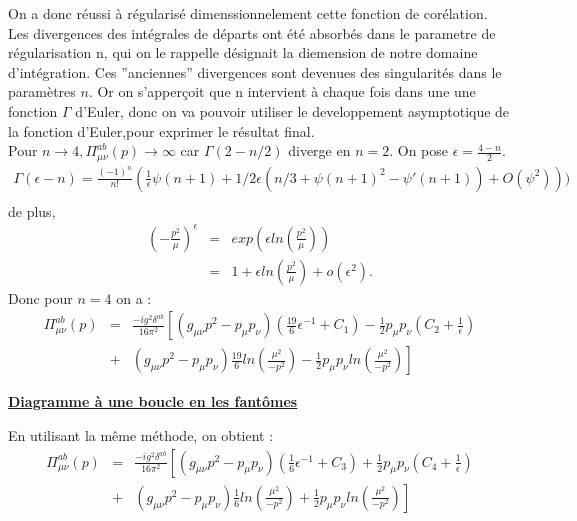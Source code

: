 \documentclass[a4paper,11pt]{article} %
\theoremstyle{plain}
\theoremstyle{definition}
\theoremstyle{remark}
\numberwithin{equation}{section}
\numberwithin{equation}{subsection}
\numberwithin{figure}{section}
\begin{document}
On a donc réussi à régularisé dimenssionnelement cette fonction de corélation. Les divergences des intégrales de départs ont été 
absorbés dans le parametre de régularisation n, qui on le rappelle désignait la diemension de notre domaine d'intégration. Ces ''anciennes'' 
divergences sont devenues des singularités dans le paramètres $n$. Or on s'apperçoit que n intervient à chaque fois dans une une 
fonction $\Gamma$ d'Euler, donc on va pouvoir utiliser le developpement asymptotique de la fonction d'Euler,pour exprimer le résultat final.\\
Pour $n \rightarrow 4 , \Pi^{ab}_{\mu\nu}(p) \rightarrow \infty$ car $ \Gamma(2-n/2)$ diverge en $n=2$.
On pose $\epsilon = \frac{4-n}{2}$.
\begin{eqnarray*}
 \Gamma(\epsilon-n) = \frac{(-1)^{n}}{n!} ( \frac{1}{\epsilon} \psi(n+1) + 1/2 \epsilon(n/3 + \psi(n+1)^2 - \psi'(n+1))+ O(\psi^{2}))) \nonumber  \\
\end{eqnarray*}
de plus,
\begin{eqnarray*}
 \left(-\frac{p^2}{\mu}\right)^{\epsilon} &=& exp(\epsilon ln(\frac{p^2}{\mu}) )  \nonumber \\
                                          &=& 1+\epsilon ln(\frac{p^2}{\mu}) + o(\epsilon^{2}).
\end{eqnarray*}
Donc pour $n=4$ on a :
\begin{eqnarray*}
\Pi^{ab}_{\mu\nu}(p) &=& \frac{-i g^2 \delta^{ab}}{16 \pi^{2}} \left[
\left( g_{\mu\nu}p^2 - p_{\mu}p_{\nu} \right) \left( \frac{19}{6} \epsilon^{-1} + C_1 \right)
- \frac{1}{2} p_{\mu} p_{\nu} ( C_2 + \frac{1}{\epsilon} ) \right.  \nonumber  \\ 
    &+& \left. \left( g_{\mu \nu} p^2 - p_{\mu} p_{\nu} \right) \frac{19}{6} ln(\frac{\mu^2}{-p^2})
-\frac{1}{2} p_{\mu} p_{\nu}  ln( \frac{\mu^2}{- p^2} ) \right]
\end{eqnarray*}  

\noindent
\underline{\textbf{Diagramme à une boucle en les fantômes}}



\noindent
En utilisant la même méthode, on obtient : 
\begin{eqnarray*}
\Pi^{ab}_{\mu\nu}(p) &=& \frac{-i g^2 \delta^{ab}}{16 \pi^{2}} \left[
\left( g_{\mu\nu}p^2 - p_{\mu}p_{\nu} \right) \left( \frac{1}{6} \epsilon^{-1} + C_3 \right)
+ \frac{1}{2} p_{\mu} p_{\nu} ( C_4 + \frac{1}{\epsilon} ) \right.\\ 
    &+& \left. \left( g_{\mu \nu} p^2 - p_{\mu} p_{\nu} \right) \frac{1}{6} ln(\frac{\mu^2}{-p^2})
+\frac{1}{2} p_{\mu} p_{\nu}  ln( \frac{\mu^2}{- p^2} ) \right]
\end{eqnarray*}
\end{document}
